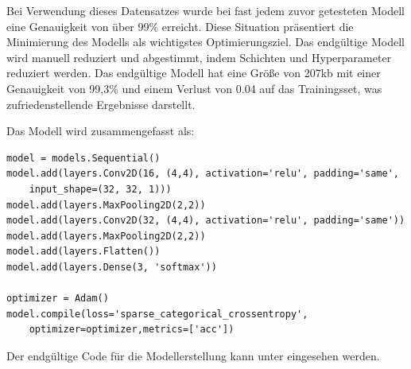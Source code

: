 Bei Verwendung dieses Datensatzes wurde bei fast jedem zuvor getesteten Modell eine Genauigkeit von über 99\% erreicht.
Diese Situation präsentiert die Minimierung des Modells als wichtigstes Optimierungsziel.
Das endgültige Modell wird manuell reduziert und abgestimmt, indem Schichten und Hyperparameter reduziert werden.
Das endgültige Modell hat eine Größe von 207kb mit einer Genauigkeit von 99,3\% und einem Verlust von 0.04 auf das Trainingsset, was zufriedenstellende Ergebnisse darstellt.

Das Modell wird zusammengefasst als:

\begin{lstlisting}[caption={Definition des finalen Modells.}]
model = models.Sequential()
model.add(layers.Conv2D(16, (4,4), activation='relu', padding='same',
    input_shape=(32, 32, 1)))
model.add(layers.MaxPooling2D(2,2))
model.add(layers.Conv2D(32, (4,4), activation='relu', padding='same'))
model.add(layers.MaxPooling2D(2,2))
model.add(layers.Flatten())
model.add(layers.Dense(3, 'softmax'))

optimizer = Adam()
model.compile(loss='sparse_categorical_crossentropy',
    optimizer=optimizer,metrics=['acc'])
\end{lstlisting}

Der endgültige Code für die Modellerstellung kann unter  eingesehen werden.
